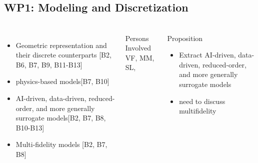 \subsection{WP1: Modeling and Discretization}
\begin{frame}
  \frametitle{\insertsectionhead}
  \framesubtitle{\insertsubsectionhead}

  \begin{columns}
    \begin{itemize}
      \item Geometric representation and their discrete counterparts [B2, B6, B7, B9, B11-B13] 
      \item physics-based models[B7, B10] 
      \item AI-driven, data-driven, reduced-order, and more generally surrogate models[B2, B7, B8, B10-B13]
      \item Multi-fidelity models [B2, B7, B8]
    \end{itemize}

    \begin{alertblock}{Persons Involved}
      VF, MM, SL, 
    \end{alertblock}
    \begin{alertblock}{Proposition}
    \begin{itemize}
      \item Extract AI-driven, data-driven, reduced-order, and more generally surrogate models
      \item need to discuss multifidelity
    \end{itemize}
  \end{alertblock}


  \end{columns}


\end{frame}


